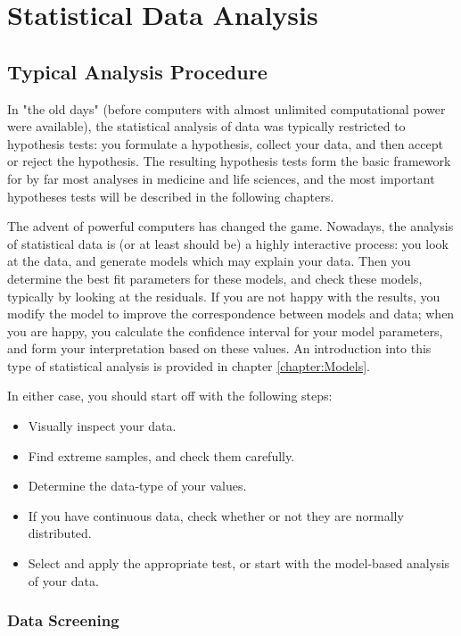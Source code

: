 \chapter{Statistical Data Analysis}

\section{Typical Analysis Procedure}

In "the old days" (before computers with almost unlimited computational power were available), the statistical analysis of data was typically restricted to hypothesis tests: you formulate a hypothesis, collect your data, and then accept or reject the hypothesis. The resulting hypothesis tests form the basic framework for by far most analyses in  medicine and life sciences, and the most important hypotheses tests will be described in the following chapters.

The advent of powerful computers has changed the game. Nowadays, the analysis of statistical data is (or at least should be) a highly interactive process: you look at the data, and generate models which may explain your data. Then you determine the best fit parameters for these models, and check these models, typically by looking at the residuals. If you are not happy with the results, you modify the model to improve the correspondence between models and data; when you are happy, you calculate the confidence interval for your model parameters, and form your interpretation based on these values. An introduction into this type of statistical analysis is provided in chapter \ref{chapter:Models}.

In either case, you should start off with the following steps:
\begin{itemize}
  \item Visually inspect your data.
  \item Find extreme samples, and check them carefully.
  \item Determine the data-type of your values.
  \item If you have continuous data, check whether or not they are normally distributed.
  \item Select and apply the appropriate test, or start with the model-based analysis of your data.
\end{itemize}

\subsection{Data Screening}

